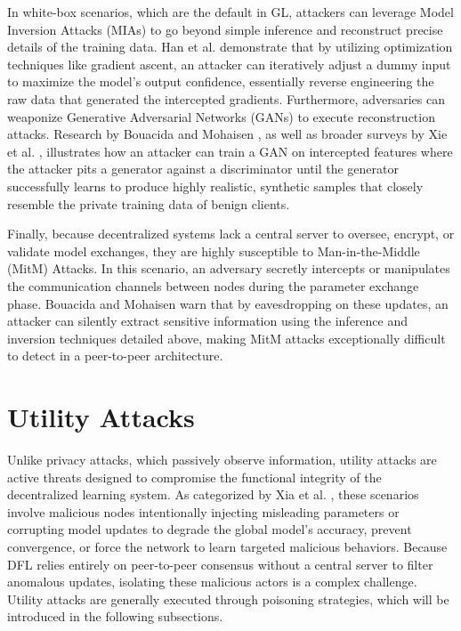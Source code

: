 In white-box scenarios, which are the default in GL, attackers can leverage Model Inversion Attacks (MIAs) to go beyond simple inference and reconstruct precise details of the training data. Han et al. \cite{han2023reinforcement} demonstrate that by utilizing optimization techniques like gradient ascent, an attacker can iteratively adjust a dummy input to maximize the model's output confidence, essentially reverse engineering the raw data that generated the intercepted gradients. Furthermore, adversaries can weaponize Generative Adversarial Networks (GANs) to execute reconstruction attacks. Research by Bouacida and Mohaisen \cite{bouacida2021vulnerabilities}, as well as broader surveys by Xie et al. \cite{xie2024survey}, illustrates how an attacker can train a GAN on intercepted features where the attacker pits a generator against a discriminator until the generator successfully learns to produce highly realistic, synthetic samples that closely resemble the private training data of benign clients.

Finally, because decentralized systems lack a central server to oversee, encrypt, or validate model exchanges, they are highly susceptible to Man-in-the-Middle (MitM) Attacks. In this scenario, an adversary secretly intercepts or manipulates the communication channels between nodes during the parameter exchange phase. Bouacida and Mohaisen \cite{bouacida2021vulnerabilities} warn that by eavesdropping on these updates, an attacker can silently extract sensitive information using the inference and inversion techniques detailed above, making MitM attacks exceptionally difficult to detect in a peer-to-peer architecture.

\section{Utility Attacks}

Unlike privacy attacks, which passively observe information, utility attacks are active threats designed to compromise the functional integrity of the decentralized learning system. As categorized by Xia et al. \cite{xia2023poisoning}, these scenarios involve malicious nodes intentionally injecting misleading parameters or corrupting model updates to degrade the global model's accuracy, prevent convergence, or force the network to learn targeted malicious behaviors. Because DFL relies entirely on peer-to-peer consensus without a central server to filter anomalous updates, isolating these malicious actors is a complex challenge. Utility attacks are generally executed through poisoning strategies, which will be introduced in the following subsections.

